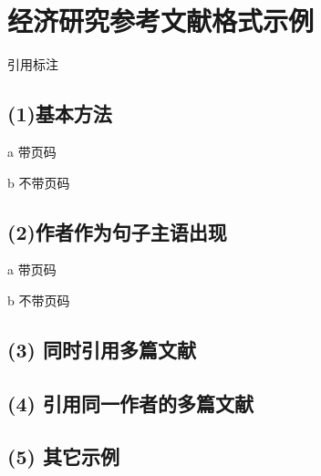 \documentclass[twoside]{article}
\begin{document}
    \section{经济研究参考文献格式示例}

引用标注

\subsection*{(1)基本方法}

a 带页码

\cite[第34页]{吕捷2015cpi}

\cite[p.55]{bernanke1989agency}


b 不带页码

\cite{吕捷2015cpi}

\cite{bernanke1989agency}

\subsection*{(2)作者作为句子主语出现}

a 带页码

\textcite[第34页]{吕捷2015cpi}

b 不带页码

\textcite{吕捷2015cpi}

\subsection*{(3) 同时引用多篇文献}

\cite{吕捷2015cpi,方军雄2007所有制,李晓西1994转轨过程中的结构性通货膨胀}

\textcite{吕捷2015cpi,方军雄2007所有制,bernanke1989agency}

\subsection*{(4) 引用同一作者的多篇文献}

\cite{杨光2010经济波动,杨光2015经济波动,杨光2015经济波动b,杨光2017经济波动}

\subsection*{(5) 其它示例}

\cite{杨光2015经济波动,杨光2015经济波动b,方军雄2007所有制,李晓西1994转轨过程中的结构性通货膨胀,刘凤良2017}

\cite{约翰1978--}
\cite{John1978--}
\cite{李四1991--,李四1991b--}
\cite{曾约翰1978--}
\cite{Carlson2000}
\nocite{*}

    \printbibliography

    
\end{document}
